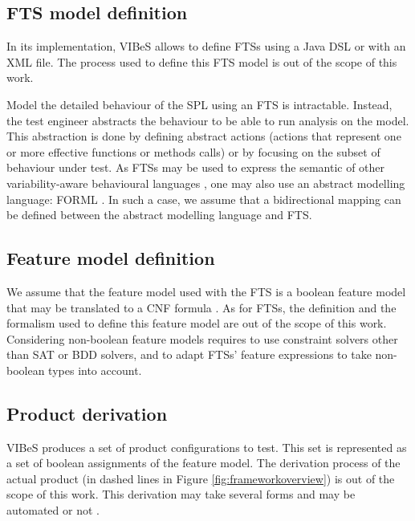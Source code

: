 \subsection{FTS model definition}

In its implementation, \gls{VIBeS} allows to define FTSs using a Java DSL or with an XML file. The process used to define this \gls{FTS} model is out of the scope of this work. 

Model the detailed behaviour of the \gls{SPL} using an \gls{FTS} is intractable. Instead, the test engineer abstracts the behaviour to be able to run analysis on the model. This abstraction is done by defining abstract actions (\ie actions that represent one or more effective functions or methods calls) or by focusing on the subset of behaviour under test. As \glspl{FTS} may be used to express the semantic of other variability-aware behavioural languages \cite{Cordy2014}, one may also use an abstract modelling language: \eg FORML \cite{Shaker2012a,Shaker2012}. In such a case, we assume that a bidirectional mapping can be defined between the abstract modelling language and FTS.

\subsection{Feature model definition}

We assume that the feature model used with the \gls{FTS} is a boolean feature model that may be translated to a \gls{CNF} formula \cite{Batory2005,Schobbens2007}. As for \glspl{FTS}, the definition and the formalism used to define this feature model are out of the scope of this work. Considering non-boolean feature models requires to use constraint solvers other than \gls{SAT} or \gls{BDD} solvers, and to adapt \glspl{FTS}' feature expressions to take non-boolean types into account.

\subsection{Product derivation}

\gls{VIBeS} produces a set of product configurations to test. This set is represented as a set of boolean assignments of the feature model. The derivation process of the actual product (in dashed lines in Figure \ref{fig:frameworkoverview}) is out of the scope of this work. This derivation may take several forms and may be automated or not \cite{Pohl2005}.

